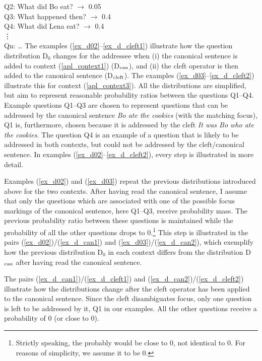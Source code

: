 \documentclass[output=paper,colorlinks,citecolor=brown]{langscibook}
\begin{document}
Q2: What did Bo eat? $\rightarrow$ 0.05\\
Q3: What happened then? $\rightarrow$ 0.4\\
Q4: What did Lena eat? $\rightarrow$ 0.4\\
\hspace{3ex}\vdots\\
Qn: \dots
\z
% 
\noindent The examples (\ref{ex_d02}--\ref{ex_d_cleft1}) illustrate how the question distribution D$_{0}$ changes for the addressee when (i) the canonical sentence is added to context (\ref{apl_context1}) (D$\textsubscript{can}$), and (ii) the cleft operator is then added to the canonical sentence (D$\textsubscript{cleft}$). The examples (\ref{ex_d03}--\ref{ex_d_cleft2}) illustrate this for context (\ref{apl_context3}). All the distributions are simplified, but aim to represent reasonable probability ratios between the questions Q1--Q4. Example questions Q1--Q3 are chosen to represent questions that can be addressed by the canonical sentence \textit{Bo ate the cookies} (with the matching focus), Q1 is, furthermore, chosen because it is addressed by the cleft \textit{It was Bo who ate the cookies}. The question Q4 is an example of a question that is likely to be addressed in both contexts, but could not be addressed by the cleft/canonical sentence. In examples (\ref{ex_d02}--\ref{ex_d_cleft2}), every step is illustrated in more detail.

Examples (\ref{ex_d02}) and (\ref{ex_d03}) repeat the previous distributions introduced above for the two contexts. After having read the canonical sentence, I assume that only the questions which are associated with one of the possible focus markings of the canonical sentence, here Q1--Q3, receive probability mass. The previous probability ratio between these questions is maintained while the probability of all the other questions drops to 0.\footnote{Strictly speaking, the probably would be close to 0, not identical to 0. For reasons of simplicity, we assume it to be 0.} This step is illustrated in the pairs (\ref{ex_d02})/(\ref{ex_d_can1}) and (\ref{ex_d03})/(\ref{ex_d_can2}), which exemplify how the previous distribution D$_{0}$ in each context differs from the distribution D$\textsubscript{can}$ after having read the canonical sentence.

The pairs (\ref{ex_d_can1})/(\ref{ex_d_cleft1}) and (\ref{ex_d_can2})/(\ref{ex_d_cleft2}) illustrate how the distributions change after the cleft operator has been applied to the canonical sentence. Since the cleft disambiguates focus, only one question is left to be addressed by it, Q1 in our examples. All the other questions receive a probability of 0 (or close to 0).
\end{document}
